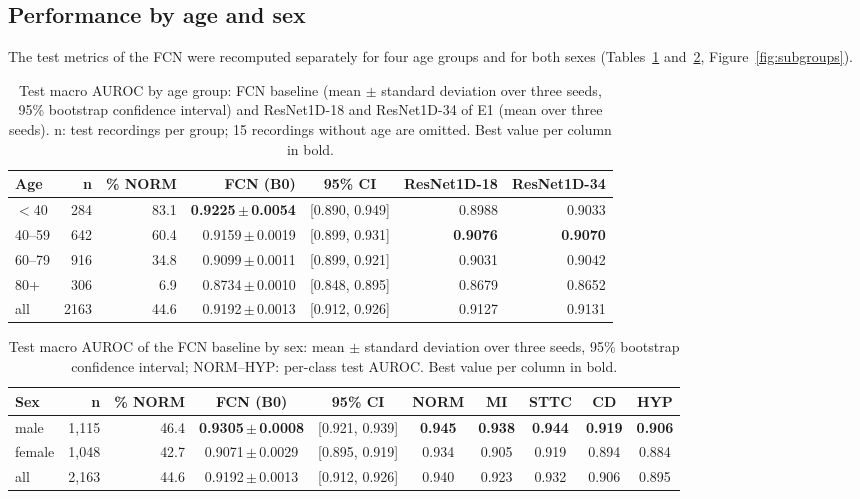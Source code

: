 \documentclass{article}
\begin{document}
\subsection{Performance by age and sex}
\label{sec:subgroups}

The test metrics of the FCN were recomputed separately for four age groups and for both sexes (Tables~\ref{tab:age} and~\ref{tab:sex}, Figure~\ref{fig:subgroups}).

\begin{table}[htb]
  \caption{Test macro AUROC by age group: FCN baseline (mean $\pm$ standard deviation over three seeds, 95\% bootstrap confidence interval) and ResNet1D-18 and ResNet1D-34 of E1 (mean over three seeds). n: test recordings per group; 15 recordings without age are omitted. Best value per column in bold.}
  \label{tab:age}
  \centering\footnotesize
  \begin{adjustbox}{max width=\linewidth}
  \begin{tabular}{lrrrcrr}
    \toprule
    Age & n & \% NORM & FCN (B0) & 95\% CI & ResNet1D-18 & ResNet1D-34 \\
    \midrule
    $<$40 & 284 & 83.1 & \textbf{0.9225\,$\pm$\,0.0054} & [0.890, 0.949] & 0.8988 & 0.9033 \\
    40--59 & 642 & 60.4 & 0.9159\,$\pm$\,0.0019 & [0.899, 0.931] & \textbf{0.9076} & \textbf{0.9070} \\
    60--79 & 916 & 34.8 & 0.9099\,$\pm$\,0.0011 & [0.899, 0.921] & 0.9031 & 0.9042 \\
    80+ & 306 & 6.9 & 0.8734\,$\pm$\,0.0010 & [0.848, 0.895] & 0.8679 & 0.8652 \\
    all & 2163 & 44.6 & 0.9192\,$\pm$\,0.0013 & [0.912, 0.926] & 0.9127 & 0.9131 \\
    \bottomrule
  \end{tabular}
  \end{adjustbox}
\end{table}

\begin{table}[htb]
  \caption{Test macro AUROC of the FCN baseline by sex: mean $\pm$ standard deviation over three seeds, 95\% bootstrap confidence interval; NORM--HYP: per-class test AUROC. Best value per column in bold.}
  \label{tab:sex}
  \centering\footnotesize
  \begin{adjustbox}{max width=\linewidth}
  \begin{tabular}{lrrccccccc}
    \toprule
    Sex & n & \% NORM & FCN (B0) & 95\% CI & NORM & MI & STTC & CD & HYP \\
    \midrule
    male & 1,115 & 46.4 & \textbf{0.9305\,$\pm$\,0.0008} & [0.921, 0.939] & \textbf{0.945} & \textbf{0.938} & \textbf{0.944} & \textbf{0.919} & \textbf{0.906} \\
    female & 1,048 & 42.7 & 0.9071\,$\pm$\,0.0029 & [0.895, 0.919] & 0.934 & 0.905 & 0.919 & 0.894 & 0.884 \\
    all & 2,163 & 44.6 & 0.9192\,$\pm$\,0.0013 & [0.912, 0.926] & 0.940 & 0.923 & 0.932 & 0.906 & 0.895 \\
    \bottomrule
  \end{tabular}
  \end{adjustbox}
\end{table}
\end{document}
